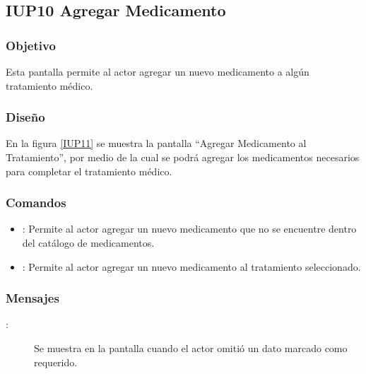 \subsection{IUP10 Agregar Medicamento}
 
\subsubsection{Objetivo}

    Esta pantalla permite al actor agregar un nuevo medicamento a algún tratamiento médico.

\subsubsection{Diseño}

    En la figura \ref{IUP11} se muestra la pantalla ``Agregar Medicamento al Tratamiento'', por medio de la cual se podrá agregar los medicamentos necesarios para completar el tratamiento médico. \\


\subsubsection{Comandos}
\begin{itemize}
    \item {}: Permite al actor agregar un nuevo medicamento que no se encuentre dentro del catálogo de medicamentos.
    \item {}: Permite al actor agregar un nuevo medicamento al tratamiento seleccionado.
\end{itemize}

\subsubsection{Mensajes}

\begin{description}
    \item[:] Se muestra en la pantalla  cuando el actor omitió un dato marcado como requerido.
   
\end{description}
